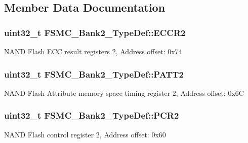 \subsection{Member Data Documentation}
\subsubsection[{\texorpdfstring{E\+C\+C\+R2}{ECCR2}}]{ uint32\+\_\+t F\+S\+M\+C\+\_\+\+Bank2\+\_\+\+Type\+Def\+::\+E\+C\+C\+R2}\hypertarget{struct_f_s_m_c___bank2___type_def_afebea17b3ac79d86ad59ce299ab5dd83}{}\label{struct_f_s_m_c___bank2___type_def_afebea17b3ac79d86ad59ce299ab5dd83}
N\+A\+ND Flash E\+CC result registers 2, Address offset\+: 0x74 
\subsubsection[{\texorpdfstring{P\+A\+T\+T2}{PATT2}}]{ uint32\+\_\+t F\+S\+M\+C\+\_\+\+Bank2\+\_\+\+Type\+Def\+::\+P\+A\+T\+T2}\hypertarget{struct_f_s_m_c___bank2___type_def_a9b2c273e4b84f24efbd731bd4ba76a84}{}\label{struct_f_s_m_c___bank2___type_def_a9b2c273e4b84f24efbd731bd4ba76a84}
N\+A\+ND Flash Attribute memory space timing register 2, Address offset\+: 0x6C 
\subsubsection[{\texorpdfstring{P\+C\+R2}{PCR2}}]{ uint32\+\_\+t F\+S\+M\+C\+\_\+\+Bank2\+\_\+\+Type\+Def\+::\+P\+C\+R2}\hypertarget{struct_f_s_m_c___bank2___type_def_ad1eabc89a4eadb5cc6a42c1e39a39ff8}{}\label{struct_f_s_m_c___bank2___type_def_ad1eabc89a4eadb5cc6a42c1e39a39ff8}
N\+A\+ND Flash control register 2, Address offset\+: 0x60 
